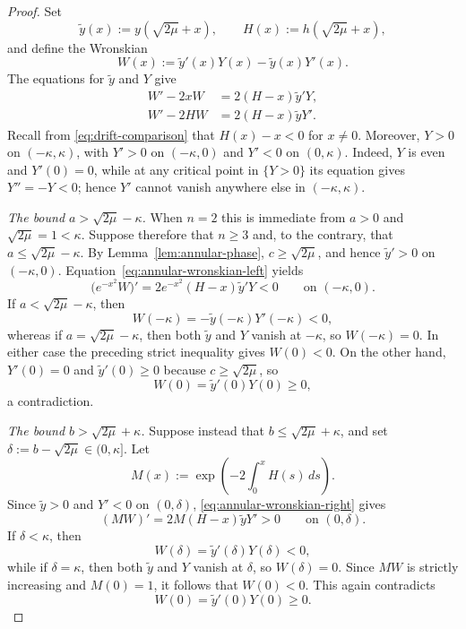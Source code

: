 \documentclass[11pt]{article}
\numberwithin{equation}{section}
\theoremstyle{definition}
\begin{document}
\begin{proof}
Set
\[
    \widetilde y(x):=y(\sqrt{2\mu}+x),
    \qquad
    H(x):=h(\sqrt{2\mu}+x),
\]
and define the Wronskian
\[
    W(x):=\widetilde y'(x)Y(x)-\widetilde y(x)Y'(x).
\]
The equations for $\widetilde y$ and $Y$ give
\begin{align}
    W'-2xW&=2(H-x)\widetilde y'Y,
    \label{eq:annular-wronskian-left}\\
    W'-2HW&=2(H-x)\widetilde yY'.
    \label{eq:annular-wronskian-right}
\end{align}
Recall from \eqref{eq:drift-comparison} that $H(x)-x<0$ for $x\neq0$.
Moreover, $Y>0$ on $(-\kappa,\kappa)$, with $Y'>0$ on
$(-\kappa,0)$ and $Y'<0$ on $(0,\kappa)$. Indeed, $Y$ is even and
$Y'(0)=0$, while at any critical point in $\{Y>0\}$ its equation gives
$Y''=-Y<0$; hence $Y'$ cannot vanish anywhere else in
$(-\kappa,\kappa)$.

\emph{The bound $a>\sqrt{2\mu}-\kappa$.}
When $n=2$ this is immediate from $a>0$ and $\sqrt{2\mu}=1<\kappa$.
Suppose therefore that $n\geq3$ and, to the contrary, that
$a\leq\sqrt{2\mu}-\kappa$. By Lemma~\ref{lem:annular-phase},
$c\geq\sqrt{2\mu}$, and hence $\widetilde y'>0$ on $(-\kappa,0)$.
Equation~\eqref{eq:annular-wronskian-left} yields
\[
    \bigl(e^{-x^2}W\bigr)'
    =2e^{-x^2}(H-x)\widetilde y'Y<0
    \qquad\text{on }(-\kappa,0).
\]
If $a<\sqrt{2\mu}-\kappa$, then
\[
    W(-\kappa)=-\widetilde y(-\kappa)Y'(-\kappa)<0,
\]
whereas if $a=\sqrt{2\mu}-\kappa$, then both $\widetilde y$ and $Y$
vanish at $-\kappa$, so $W(-\kappa)=0$. In either case the preceding
strict inequality gives $W(0)<0$. On the other hand, $Y'(0)=0$ and
$\widetilde y'(0)\geq0$ because $c\geq\sqrt{2\mu}$, so
\[
    W(0)=\widetilde y'(0)Y(0)\geq0,
\]
a contradiction.

\emph{The bound $b>\sqrt{2\mu}+\kappa$.}
Suppose instead that $b\leq\sqrt{2\mu}+\kappa$, and set
$\delta:=b-\sqrt{2\mu}\in(0,\kappa]$. Let
\[
    M(x):=\exp\left(-2\int_0^x H(s)\,ds\right).
\]
Since $\widetilde y>0$ and $Y'<0$ on $(0,\delta)$,
\eqref{eq:annular-wronskian-right} gives
\[
    (MW)'=2M(H-x)\widetilde yY'>0
    \qquad\text{on }(0,\delta).
\]
If $\delta<\kappa$, then
\[
    W(\delta)=\widetilde y'(\delta)Y(\delta)<0,
\]
while if $\delta=\kappa$, then both $\widetilde y$ and $Y$ vanish at
$\delta$, so $W(\delta)=0$. Since $MW$ is strictly increasing and
$M(0)=1$, it follows that $W(0)<0$. This again contradicts
\[
    W(0)=\widetilde y'(0)Y(0)\geq0.
\]
\end{proof}
\end{document}
